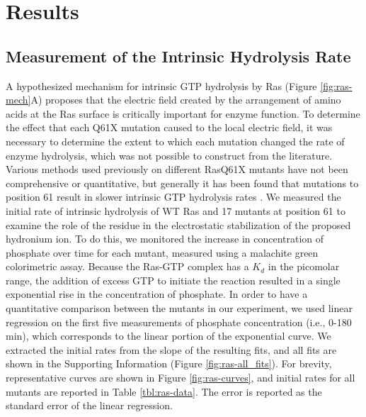\section{Results} \label{ras-results}

\subsection{Measurement of the Intrinsic Hydrolysis Rate}

A hypothesized mechanism for intrinsic GTP hydrolysis by Ras (Figure \ref{fig:ras-mech}A) proposes that the electric field created by the arrangement of amino acids at the Ras surface is critically important for enzyme function. 
To determine the effect that each Q61X mutation caused to the local electric field, it was necessary to determine the extent to which each mutation changed the rate of enzyme hydrolysis, which was not possible to construct from the literature. 
Various methods used previously on different RasQ61X mutants have not been comprehensive or quantitative, but generally it has been found that mutations to position 61 result in slower intrinsic GTP hydrolysis rates \cite{Der1986, Krengel1990}. 
We measured the initial rate of intrinsic hydrolysis of WT Ras and 17 mutants at position 61 to examine the role of the residue in the electrostatic stabilization of the proposed hydronium ion. 
To do this, we monitored the increase in concentration of phosphate over time for each mutant, measured using a malachite green colorimetric assay. 
Because the Ras-GTP complex has a $K_d$ in the picomolar range, the addition of excess GTP to initiate the reaction resulted in a single exponential rise in the concentration of phosphate. 
In order to have a quantitative comparison between the mutants in our experiment, we used linear regression on the first five measurements of phosphate concentration (i.e., 0-180 min), which corresponds to the linear portion of the exponential curve. 
We extracted the initial rates from the slope of the resulting fits, and all fits are shown in the Supporting Information (Figure \ref{fig:ras-all_fits}). 
For brevity, representative curves are shown in Figure \ref{fig:ras-curves}, and initial rates for all mutants are reported in Table \ref{tbl:ras-data}. 
The error is reported as the standard error of the linear regression. 
